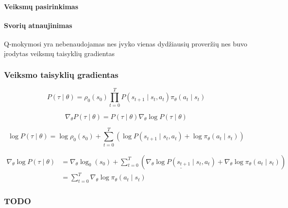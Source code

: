 \documentclass[a4paper, 12pt]{article}
\begin{document}
\paragraph{Veiksmų pasirinkimas}

\paragraph{Svorių atnaujinimas}







Q-mokymosi yra nebenaudojamas  nes įvyko vienas dydžiausių proveržių nes buvo įrodytas veiksmų taisyklių gradientas 


\subsubsection{Veiksmo taisyklių gradientas}

\begin{equation}
P(\tau \mid \theta)=\rho_{0}\left(s_{0}\right) \prod_{t=0}^{T} P\left(s_{t+1} \mid s_{t}, a_{t}\right) \pi_{\theta}\left(a_{t} \mid s_{t}\right)
\end{equation}


\begin{equation}
\nabla_{\theta} P(\tau \mid \theta)=P(\tau \mid \theta) \nabla_{\theta} \log P(\tau \mid \theta)
\end{equation}

\begin{equation}
\log P(\tau \mid \theta)=\log \rho_{0}\left(s_{0}\right)+\sum_{t=0}^{T}\left(\log P\left(s_{t+1} \mid s_{t}, a_{t}\right)+\log \pi_{\theta}\left(a_{t} \mid s_{t}\right)\right)
\end{equation}

\begin{equation}
\begin{aligned}
\nabla_{\theta} \log P(\tau \mid \theta) &=\nabla_{\theta} \log _{0}\left(s_{0}\right)+\sum_{t=0}^{T}\left(\underline{\nabla_{\theta} \log P\left(s_{t+1} \mid s_{t}, a_{t}\right)}+\nabla_{\theta} \log \pi_{\theta}\left(a_{t} \mid s_{t}\right)\right) \\
&=\sum_{t=0}^{T} \nabla_{\theta} \log \pi_{\theta}\left(a_{t} \mid s_{t}\right)
\end{aligned}
\end{equation}

\subsubsection{TODO}
\end{document}
